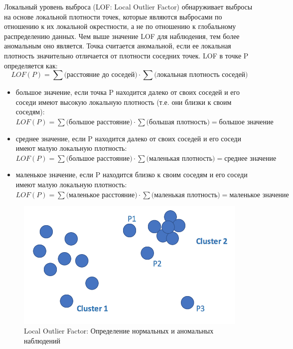 \documentclass[12pt]{article}
\begin{document}
    Локальный уровень выброса (LOF: Local Outlier Factor) обнаруживает выбросы на основе локальной плотности точек, которые являются выбросами по отношению к их локальной окрестности, а не по отношению к глобальному распределению данных. Чем выше значение LOF для наблюдения, тем более аномальным оно является. Точка считается аномальной, если ее локальная плотность значительно отличается от плотности соседних точек. LOF в точке P определяется как:
    \begin{equation}
    \label{sec:Research:Model:LocalOutlierFactor:formula:LOF}
        LOF(P) = \sum \text{(расстояние до соседей)} \cdot \sum \text{(локальная плотность соседей)}
    \end{equation}

    \begin{itemize}
        \item большое значение, если точка P находится далеко от своих соседей и его соседи имеют высокую локальную плотность (т.е. они близки к своим соседям): \\ 
        $ LOF(P) = \sum {\text{(большое расстояние)}} \cdot \sum \text{(большая плотность)} = \text{большое значение}$
        \item среднее значение, если P находится далеко от своих соседей и его соседи имеют малую локальную плотность: \\
        $ LOF(P) = \sum \text{(большое расстояние)} \cdot \sum \text{(маленькая плотность)} = \text{среднее значение} $
        \item маленькое значение, если P находится близко к своим соседям и его соседи имеют малую локальную плотность: \\
        $ LOF(P) = \sum \text{(маленькое расстояние)} \cdot \sum \text{(маленькая плотность)} = \text{маленькое значение} $
    \end{itemize}
    
    \begin{figure}[h!]
        \centering
        \includegraphics[width=0.6\linewidth]{LocalOutlierFactor.png}
        \caption{Local Outlier Factor: Определение нормальных и аномальных наблюдений}
        \label{sec:Research:Model:LocalOutlierFactor:fig:LocalOutlierFactor}
    \end{figure}
\end{document}
